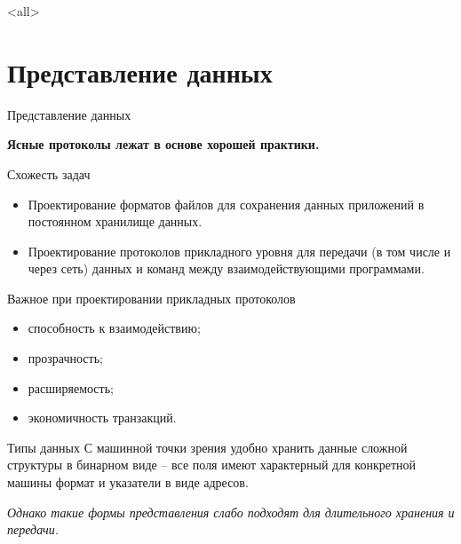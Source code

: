 

\subtitle{Форматы данных \\и проектирование пользовательских протоколов}

\mode<all>{}

%
%

\section{Представление данных}

\begin{frame}{Представление данных}
	\begin{center}
	{\Large\bfseries Ясные протоколы лежат в основе хорошей практики.}
	\end{center}
\end{frame}

\begin{frame}{Схожесть задач}
	\begin{itemize}
		\item Проектирование форматов файлов для сохранения данных приложений в постоянном хранилище данных.
		\item Проектирование протоколов прикладного уровня для передачи (в том числе и через сеть) данных и команд между взаимодействующими программами.
	\end{itemize}
\end{frame}

\begin{frame}{Важное при проектировании прикладных протоколов}
	\begin{itemize}
		\item способность к взаимодействию; 
			\pause
		\item прозрачность;
			\pause
		\item расширяемость;
			\pause
		\item экономичность транзакций.
	\end{itemize}
\end{frame}

\begin{frame}{Типы данных}
	С машинной точки зрения удобно хранить данные сложной структуры в бинарном виде -- все поля имеют характерный для конкретной машины формат и указатели в виде адресов.

	\pause
	{\itshape Однако такие формы представления слабо подходят для длительного хранения и передачи.}
\end{frame}

